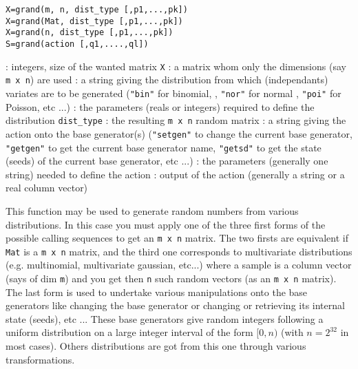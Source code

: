 \begin{mandesc}
\end{mandesc}
\begin{calling_sequence}
\begin{verbatim}
X=grand(m, n, dist_type [,p1,...,pk])  
X=grand(Mat, dist_type [,p1,...,pk])  
X=grand(n, dist_type [,p1,...,pk])  
S=grand(action [,q1,....,ql])  
\end{verbatim}
\end{calling_sequence}
\begin{parameters}
  \begin{varlist}
    : integers, size of the wanted matrix \verb!X!
   : a matrix whom only the dimensions (say \verb!m x n!) are used
   : a string giving the distribution from which (independants) variates are to be 
     generated (\verb!"bin"! for binomial, , \verb!"nor"! for normal , \verb!"poi"! for Poisson, etc ...)
   : the parameters (reals or integers) required to define the distribution 
    \verb!dist_type!
   : the resulting \verb!m x n! random matrix
   : a string giving the action onto the base generator(s) (\verb!"setgen"! to change the current base 
     generator,  \verb!"getgen"! to get the current base generator name, \verb!"getsd"! to get the 
     state (seeds) of the current base generator, etc ...)
   : the parameters (generally one string) needed to define the action
   : output of the action (generally a string or a real column vector)
  \end{varlist}
  \end{parameters}
  
\begin{mandescription}
  This function may be used to generate random numbers from various distributions. In this 
  case you must apply one of the three first forms of the possible
  calling sequences to get an \verb!m x n! matrix. 
  The two firsts are equivalent if \verb!Mat! is a \verb!m x n! matrix, 
  and the third one corresponds to multivariate distributions (e.g. multinomial, multivariate
  gaussian, etc...) where a sample is a column vector (says of dim \verb!m!)
  and you get then \verb!n! such random vectors (as an \verb!m x n! matrix). 
  The last form is used to undertake various manipulations onto the base generators
  like changing the base generator or changing or retrieving its internal state (seeds), 
  etc ... These base generators give random integers following a
  uniform distribution on a large integer interval of the form $[0,n)$
  (with $n=2^{32}$ in most cases).  Others distributions are got from
  this one through various transformations.

\end{mandescription}


